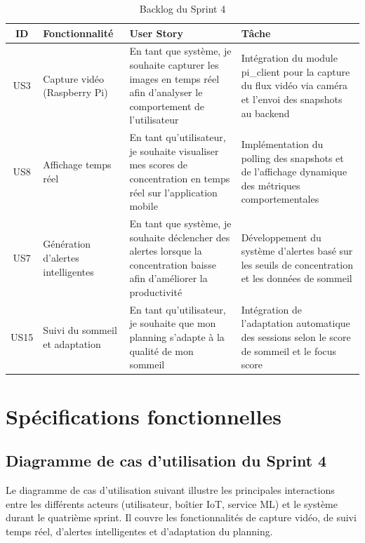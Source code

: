 \begin{table}[H]
\centering
\renewcommand{\arraystretch}{1.3}
\begin{tabular}{|c|p{3cm}|p{6cm}|p{4cm}|}
\hline
\textbf{ID} & \textbf{Fonctionnalité} & \textbf{User Story} & \textbf{Tâche} \\
\hline

US3 & Capture vidéo (Raspberry Pi)
& En tant que système, je souhaite capturer les images en temps réel afin d'analyser le comportement de l'utilisateur
& Intégration du module pi\_client pour la capture du flux vidéo via caméra et l'envoi des snapshots au backend \\ \hline

US8 & Affichage temps réel
& En tant qu'utilisateur, je souhaite visualiser mes scores de concentration en temps réel sur l'application mobile
& Implémentation du polling des snapshots et de l'affichage dynamique des métriques comportementales \\ \hline

US7 & Génération d'alertes intelligentes
& En tant que système, je souhaite déclencher des alertes lorsque la concentration baisse afin d'améliorer la productivité
& Développement du système d'alertes basé sur les seuils de concentration et les données de sommeil \\ \hline

US15 & Suivi du sommeil et adaptation
& En tant qu'utilisateur, je souhaite que mon planning s'adapte à la qualité de mon sommeil
& Intégration de l'adaptation automatique des sessions selon le score de sommeil et le focus score \\ \hline

\end{tabular}
\caption{Backlog du Sprint 4}
\label{tab:backlogs4}
\end{table}



\section{Spécifications fonctionnelles}

\subsection{Diagramme de cas d'utilisation du Sprint 4}

Le diagramme de cas d'utilisation suivant illustre les principales interactions entre les différents acteurs (utilisateur, boîtier IoT, service ML) et le système durant le quatrième sprint. Il couvre les fonctionnalités de capture vidéo, de suivi temps réel, d'alertes intelligentes et d'adaptation du planning.

